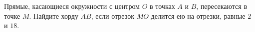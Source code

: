\begin{ex}
	\begin{condition}
		Прямые, касающиеся окружности с центром \( O  \) в точках \( A  \) и \( B \), пересекаются в точке \( M \). Найдите хорду \( AB \), если отрезок \( MO  \) делится ею на отрезки, равные \( 2  \) и \( 18 \).
	\end{condition}
\end{ex}